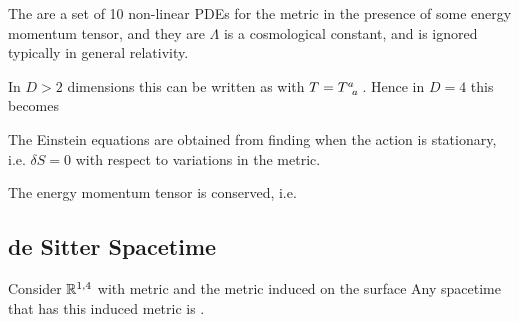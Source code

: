 \documentclass{article}
\begin{document}
\begin{definition}
The  are a set of 10 non-linear PDEs for the metric in the presence of some energy momentum tensor, and they are 
$\Lambda$ is a cosmological constant, and is ignored typically in general relativity. 
\end{definition}

\begin{prop}
In $D>2$ dimensions this can be written as 
with $T=T\indices{^a_a}$. Hence 
in $D=4$ this becomes 
\end{prop}

\begin{theorem}
The Einstein equations are obtained from finding when the action 
is stationary, i.e. $\delta S = 0$ with respect to variations in the metric. 
\end{theorem}

\begin{prop}
\end{prop}
\begin{corollary}
The energy momentum tensor is conserved, i.e. 
\end{corollary}
\subsection{de Sitter Spacetime}

\begin{definition}
Consider $\mathbb{R}^{1,4}$ with metric 
and the metric induced on the surface 
Any spacetime that has this induced metric is .
\end{definition}
\end{document}
